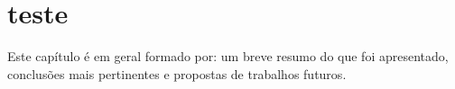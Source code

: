                       

\chapter{teste}\label{CapTeste}

Este capítulo é em geral formado por: um breve resumo do que foi apresentado, conclusões mais pertinentes e propostas de trabalhos futuros. 
